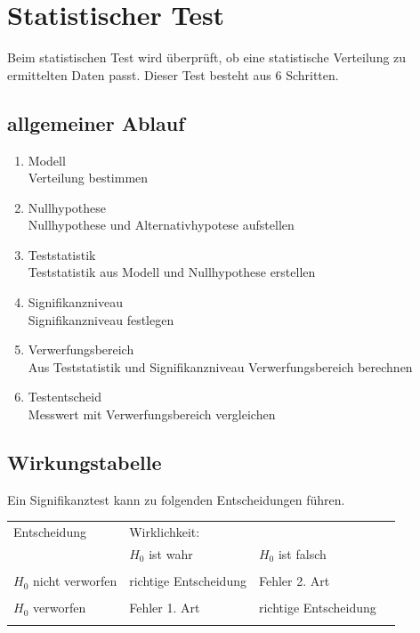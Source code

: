 \section{Statistischer Test}
Beim statistischen Test wird überprüft, ob eine statistische Verteilung zu 
ermittelten Daten passt. Dieser Test besteht aus 6 Schritten. 

\subsection{allgemeiner Ablauf}
\begin{enumerate}
  \item Modell \\
        Verteilung bestimmen
  \item Nullhypothese \\
        Nullhypothese und Alternativhypotese aufstellen
  \item Teststatistik \\
        Teststatistik aus Modell und Nullhypothese erstellen
  \item Signifikanzniveau \\
        Signifikanzniveau festlegen
  \item Verwerfungsbereich \\
        Aus Teststatistik und Signifikanzniveau Verwerfungsbereich berechnen
  \item Testentscheid \\
        Messwert mit Verwerfungsbereich vergleichen
\end{enumerate}

\subsection{Wirkungstabelle}
Ein Signifikanztest kann zu folgenden Entscheidungen führen.

\begin{table}[h!]
	\centering
	\begin{tabular}{l|lll}
	Entscheidung & Wirklichkeit: & & \\
	& $H_0$ ist wahr & $H_0$ ist falsch \\
	\hline
	&&& \\
	$H_0$ nicht verworfen & richtige Entscheidung & Fehler 2. Art \\
	&&& \\
	$H_0$ verworfen & Fehler 1. Art & richtige Entscheidung \\
	&&& \\
	\end{tabular}
\end{table}

